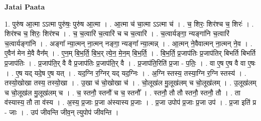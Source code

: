 \documentclass[17pt]{extarticle}
\begin{document}
\textbf{Jatai Paata} \newline

1. पुरु॑ष आ॒त्मा ऽऽत्मा पुरु॑षः॒ पुरु॑ष आ॒त्मा । . आ॒त्मा च॑ चा॒त्मा ऽऽत्मा च॑ । . च॒ शिरः॒ शिर॑श्च च॒ शिरः॑ । . शिर॑श्च च॒ शिरः॒ शिर॑श्च । . च॒ च॒त्वारि॑ च॒त्वारि॑ च च च॒त्वारि॑ । . च॒त्वार्यङ्गा॒ न्यङ्गा॑नि च॒त्वारि॑ च॒त्वार्यङ्गा॑नि । . अङ्गा᳚ न्या॒त्मन् ना॒त्मन् नङ्गा॒ न्यङ्गा᳚ न्या॒त्मन्न् । . आ॒त्मन् ने॒वैवात्मन् ना॒त्मन् ने॒व । . ए॒वैन॑ मेन मे॒वै वैन᳚म् । . ए॒न॒म् बि॒भ॒र्ति॒ बि॒भ॒र् त्ये॒न॒ मे॒न॒म् बि॒भ॒र्ति॒ । . बि॒भ॒र्ति॒ प्र॒जाप॑तिः प्र॒जाप॑तिर् बिभर्ति बिभर्ति प्र॒जाप॑तिः । . प्र॒जाप॑ति॒र् वै वै प्र॒जाप॑तिः प्र॒जाप॑ति॒र् वै । . प्र॒जाप॑ति॒रिति॑ प्र॒जा - प॒तिः॒ । . वा ए॒ष ए॒ष वै वा ए॒षः । . ए॒ष यद् यदे॒ष ए॒ष यत् । . यद॒ग्नि र॒ग्निर् यद् यद॒ग्निः । . अ॒ग्नि स्तस्य॒ तस्या॒ग्नि र॒ग्नि स्तस्य॑ । . तस्यो॒खोखा तस्य॒ तस्यो॒खा । . उ॒खा च॑ चो॒खोखा च॑ । . चो॒लूख॑ल मु॒लूख॑लम् च चो॒लूख॑लम् । . उ॒लूख॑लम् च चो॒लूख॑ल मु॒लूख॑लम् च । . च॒ स्तनौ॒ स्तनौ॑ च च॒ स्तनौ᳚ । . स्तनौ॒ तौ तौ स्तनौ॒ स्तनौ॒ तौ । . ता व॑स्यास्य॒ तौ ता व॑स्य । . अ॒स्य॒ प्र॒जाः प्र॒जा अ॑स्यास्य प्र॒जाः । . प्र॒जा उपोप॑ प्र॒जाः प्र॒जा उप॑ । . प्र॒जा इति॑ प्र - जाः । . उप॑ जीवन्ति जीव॒न् त्युपोप॑ जीवन्ति । \newline
\end{document}
